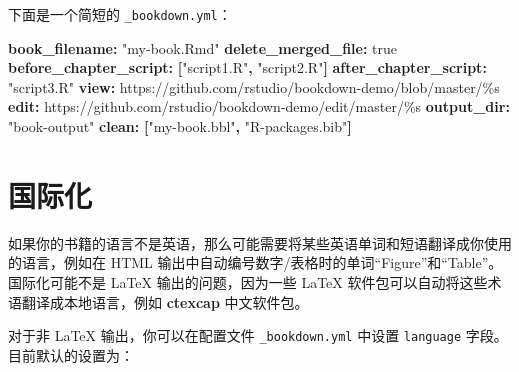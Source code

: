 \documentclass[
  12pt,
]{krantz}
\newenvironment{Shaded}{\begin{snugshade}}{\end{snugshade}}
\newcommand{\AttributeTok}[1]{\textcolor[rgb]{0.13,0.29,0.53}{#1}}
\newcommand{\CharTok}[1]{\textcolor[rgb]{0.31,0.60,0.02}{#1}}
\newcommand{\FunctionTok}[1]{\textcolor[rgb]{0.13,0.29,0.53}{\textbf{#1}}}
\newcommand{\KeywordTok}[1]{\textcolor[rgb]{0.13,0.29,0.53}{\textbf{#1}}}
\newcommand{\StringTok}[1]{\textcolor[rgb]{0.31,0.60,0.02}{#1}}
\theoremstyle{definition}
\theoremstyle{definition}
\theoremstyle{definition}
\theoremstyle{definition}
\theoremstyle{remark}
\begin{document}
下面是一个简短的 \texttt{\_bookdown.yml}：

\begin{Shaded}
\begin{Highlighting}[]
\FunctionTok{book\_filename}\KeywordTok{:}\AttributeTok{ }\StringTok{"my{-}book.Rmd"}
\FunctionTok{delete\_merged\_file}\KeywordTok{:}\AttributeTok{ }\CharTok{true}
\FunctionTok{before\_chapter\_script}\KeywordTok{:}\AttributeTok{ }\KeywordTok{[}\StringTok{"script1.R"}\KeywordTok{,}\AttributeTok{ }\StringTok{"script2.R"}\KeywordTok{]}
\FunctionTok{after\_chapter\_script}\KeywordTok{:}\AttributeTok{ }\StringTok{"script3.R"}
\FunctionTok{view}\KeywordTok{:}\AttributeTok{ https://github.com/rstudio/bookdown{-}demo/blob/master/\%s}
\FunctionTok{edit}\KeywordTok{:}\AttributeTok{ https://github.com/rstudio/bookdown{-}demo/edit/master/\%s}
\FunctionTok{output\_dir}\KeywordTok{:}\AttributeTok{ }\StringTok{"book{-}output"}
\FunctionTok{clean}\KeywordTok{:}\AttributeTok{ }\KeywordTok{[}\StringTok{"my{-}book.bbl"}\KeywordTok{,}\AttributeTok{ }\StringTok{"R{-}packages.bib"}\KeywordTok{]}
\end{Highlighting}
\end{Shaded}

\section{国际化}\label{internationalization}

如果你的书籍的语言不是英语，那么可能需要将某些英语单词和短语翻译成你使用的语言，例如在 HTML 输出中自动编号数字/表格时的单词``Figure''和``Table''。国际化可能不是 LaTeX 输出的问题，因为一些 LaTeX 软件包可以自动将这些术语翻译成本地语言，例如 \textbf{ctexcap} 中文软件包。

对于非 LaTeX 输出，你可以在配置文件 \texttt{\_bookdown.yml} 中设置 \texttt{language} 字段。目前默认的设置为：
\end{document}
